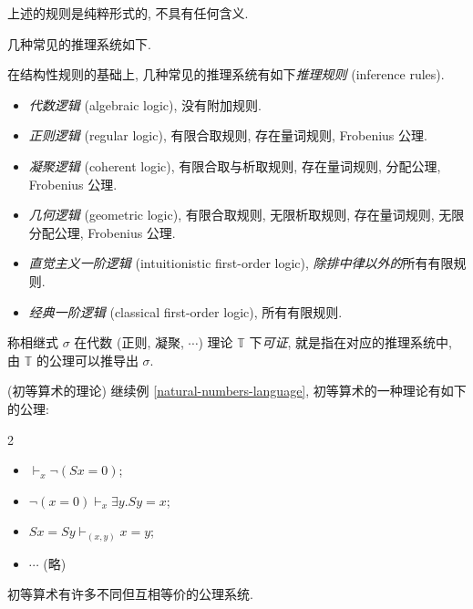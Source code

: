 \begin{remark}
	{}
	上述的规则是纯粹形式的, 不具有任何含义.
\end{remark}

几种常见的推理系统如下.

\begin{definition}
	[label={inference-rules}]
	{}
	在结构性规则的基础上, 几种常见的推理系统有如下\emph{推理规则} (inference rules).
	\begin{itemize}
		\item \emph{代数逻辑} (algebraic logic), 没有附加规则.
		\item \emph{正则逻辑} (regular logic), 有限合取规则, 存在量词规则, Frobenius 公理.
		\item \emph{凝聚逻辑} (coherent logic), 有限合取与析取规则, 存在量词规则, 分配公理, Frobenius 公理.
		\item \emph{几何逻辑} (geometric logic), 有限合取规则, 无限析取规则, 存在量词规则, 无限分配公理, Frobenius 公理.
		\item \emph{直觉主义一阶逻辑} (intuitionistic first-order logic), \emph{除排中律以外的}所有有限规则.
		\item \emph{经典一阶逻辑} (classical first-order logic), 所有有限规则.
	\end{itemize}
\end{definition}

\begin{definition}
	{}
	称相继式 $\sigma$ 在代数 (正则, 凝聚, $\cdots$) 理论 $\mathbb T$ 下\emph{可证},
	就是指在对应的推理系统中, 由 $\mathbb T$ 的公理可以推导出 $\sigma$.
\end{definition}

\begin{example}
	{(初等算术的理论)}
	继续例 \ref{natural-numbers-language}, 初等算术的一种理论有如下的公理:
	\begin{multicols*}
		{2}
		\begin{itemize}
			\item $\vdash_x \neg (Sx=0)$;
			\item $\neg(x=0) \vdash_{x} \exists y. Sy=x$;
			\item $Sx=Sy\vdash_{(x,y)} x=y$;
			\item $\cdots$ (略)
		\end{itemize}
	\end{multicols*}
	
	初等算术有许多不同但互相等价的公理系统.
\end{example}

